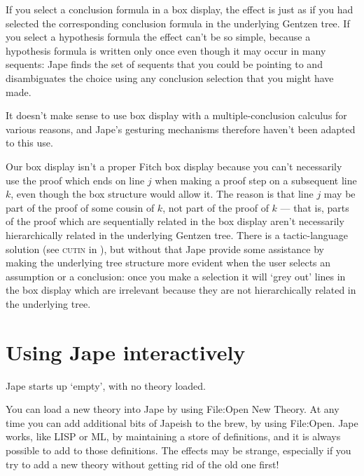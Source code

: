 If you select a conclusion formula in a box display, the effect is just as if you had selected the corresponding conclusion formula in the underlying Gentzen tree. If you select a hypothesis formula the effect can't be so simple, because a hypothesis formula is written only once even though it may occur in many sequents: Jape finds the set of sequents that you could be pointing to and disambiguates the choice using any conclusion selection that you might have made.

It doesn't make sense to use box display with a multiple-conclusion calculus for various reasons, and Jape's gesturing mechanisms therefore haven't been adapted to this use.

Our box display isn't a proper Fitch box display because you can't necessarily use the proof which ends on line $j$ when making a proof step on a subsequent line $k$, even though the box structure would allow it. The reason is that line $j$ may be part of the proof of some cousin of $k$, not part of the proof of $k$ --- that is, parts of the proof which are sequentially related in the box display aren't necessarily hierarchically related in the underlying Gentzen tree. There is a tactic-language solution (see \textsc{cutin} in ), but without that Jape provide some assistance by making the underlying tree structure more evident when the user selects an assumption or a conclusion: once you make a selection it will `grey out' lines in the box display which are irrelevant because they are not hierarchically related in the underlying tree.

\section{Using Jape interactively}


Jape starts up `empty', with no theory loaded.

You can load a new theory into Jape by using File:Open New Theory. At any time you can add additional bits of Japeish to the brew, by using File:Open. Jape works, like LISP or ML, by maintaining a store of definitions, and it is always possible to add to those definitions. The effects may be strange, especially if you try to add a new theory without getting rid of the old one first!
 